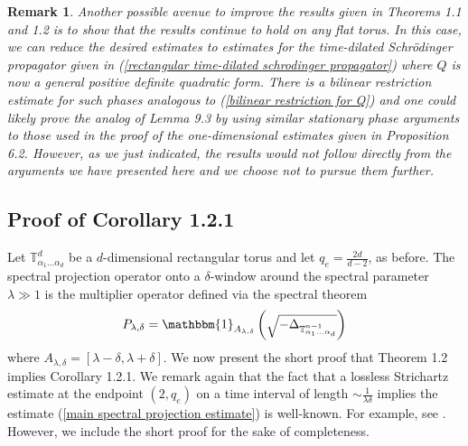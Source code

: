 \documentclass[11pt]{amsart}
\numberwithin{equation}{section}
\newcommand{\Tn}{\mathbb{T}^{n-1}}
\newcommand{\la}{\lambda}
\newcommand{\T}[1][]{\mathbb{T}^#1}
\newcommand{\laplac}[1]{\Delta_{#1}}
\newtheorem{remark}{Remark}[section]
\begin{document}
\begin{remark}
    Another possible avenue to improve the results given in Theorems 1.1 and 1.2 is to show that the results continue to hold on any flat torus. In this case, we can reduce the desired estimates to estimates for the time-dilated Schr\"{o}dinger propagator given in (\ref{rectangular time-dilated schrodinger propagator}) where $Q$ is now a general positive definite quadratic form. There is a bilinear restriction estimate for such phases analogous to (\ref{bilinear restriction for Q}) and one could likely prove the analog of Lemma 9.3 by using similar stationary phase arguments to those used in the proof of the one-dimensional estimates given in Proposition 6.2. However, as we just indicated, the results would not follow directly from the arguments we have presented here and we choose not to pursue them further.
\end{remark}

\subsection{Proof of Corollary 1.2.1} 
Let $\T{d}_{\alpha_1...\alpha_d}$ be a $d$-dimensional rectangular torus and let $q_e = \frac{2d}{d-2}$, as before. The spectral projection operator onto a $\delta$-window around the spectral parameter $\la  \gg 1$ is the multiplier operator defined via the spectral theorem
\begin{equation}
    P_{\la,\delta} = \mathbbm{1}_{A_{\la,\delta}}\left( \sqrt{-\laplac{\Tn_{\alpha_1...\alpha_d}}}\right)
\end{equation}
where $A_{\la, \delta} = [\la - \delta, \la + \delta]$. We now present the short proof that Theorem 1.2 implies Corollary 1.2.1. We remark again that the fact that a lossless Strichartz estimate at the endpoint $\left(2,q_e\right)$ on a time interval of length $\sim \frac{1}{\la\delta}$ implies the estimate (\ref{main spectral projection estimate}) is well-known. For example, see \cite{BlairHuangSoggeStrichartz}. However, we include the short proof for the sake of completeness.
\end{document}
